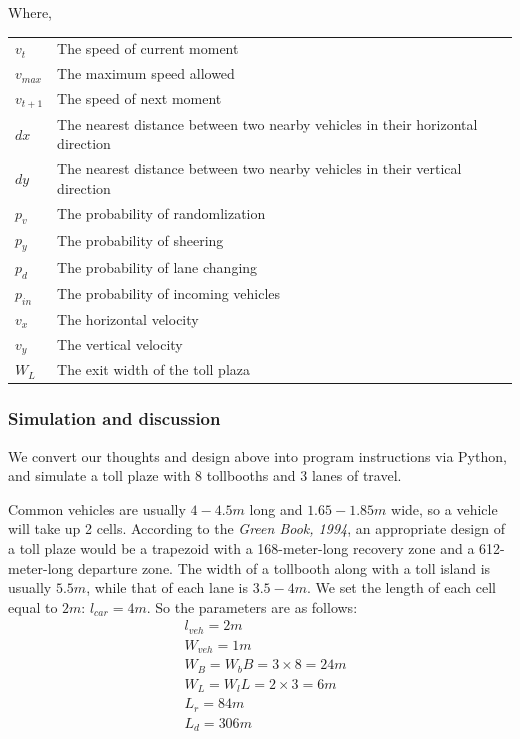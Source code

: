 \documentclass{mcmthesis}
\begin{document}
\begin{itemize}
 Where,

 \begin{table}[htbp]
   \centering
     \begin{tabular}{ll}
     \toprule
     $v_t$  & The speed of current moment \\
     $v_{max}$ & The maximum speed allowed \\
     $v_{t+1}$ & The speed of next moment \\
     $dx$    & The nearest distance between two nearby vehicles in their horizontal direction \\
     $dy$    & The nearest distance between two nearby vehicles in their vertical direction \\
     $p_v$  & The probability of randomlization \\
     $p_y$  & The probability of sheering \\
     $p_d$  & The probability of lane changing \\
     $p_{in}$ & The probability of incoming vehicles \\
     $v_x$  & The horizontal velocity \\
     $v_y$  & The vertical velocity \\
     $W_L$  & The exit width of the toll plaza\\
     \bottomrule
     \end{tabular}%
   \label{tab:addlabel}%
 \end{table}%



\end{itemize}
\subsubsection{Simulation and discussion}
We convert our thoughts and design above into program instructions via Python,
and simulate a toll plaze with 8 tollbooths and 3 lanes of travel.

Common vehicles are usually $4-4.5m$ long and $1.65-1.85m$ wide,
so a vehicle will take up 2 cells.
According to the \emph{Green Book, 1994}, an appropriate design of
a toll plaze would be a trapezoid with a
168-meter-long recovery zone and a 612-meter-long departure zone.
The width of a tollbooth along with a toll island
is usually $5.5m$, while that of each lane is $3.5-4m$.
We set the length of each cell equal to $2m$: $l_{car}=4m$.
So the parameters are as follows:
\[
\begin{align*}
&{l}_{veh}=2m\\
&{W}_{veh}=1m\\
&W_{B}={W}_{b}B=3\times8=24m\\
&W_{L}={W}_{l}L=2\times3=6m\\
&{L}_{r}=84m\\
&{L}_{d}=306m
\end{align*}
\]
\end{document}
